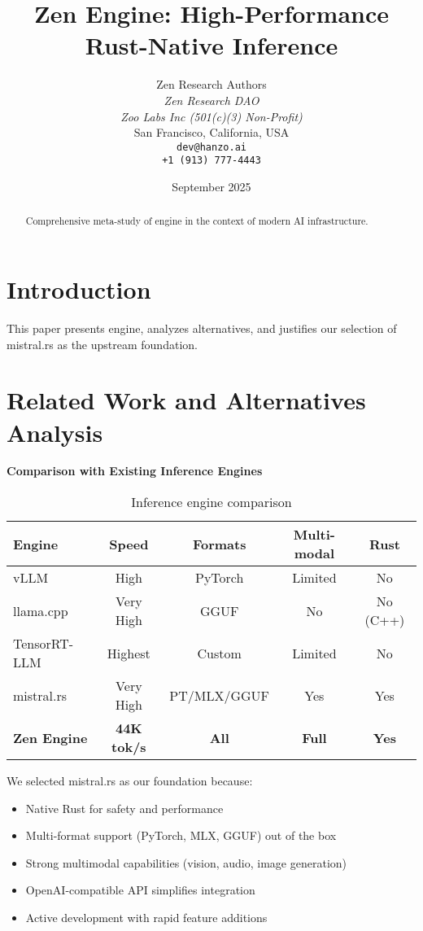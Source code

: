 \documentclass[11pt,a4paper]{article}
\title{Zen Engine: High-Performance Rust-Native Inference}
\author{
    Zen Research Authors \\
    \textit{Zen Research DAO} \\
    \textit{Zoo Labs Inc (501(c)(3) Non-Profit)} \\
    San Francisco, California, USA \\
    \texttt{dev@hanzo.ai} \\
    \texttt{+1 (913) 777-4443}
}
\date{September 2025}
\begin{document}
\maketitle

\begin{abstract}
Comprehensive meta-study of engine in the context of modern AI infrastructure.
\end{abstract}

\section{Introduction}
This paper presents engine, analyzes alternatives, and justifies our selection of mistral.rs as the upstream foundation.

\section{Related Work and Alternatives Analysis}
\textbf{Comparison with Existing Inference Engines}

\begin{table}[h]
\centering
\begin{tabular}{@{}lcccc@{}}
\toprule
\textbf{Engine} & \textbf{Speed} & \textbf{Formats} & \textbf{Multi-modal} & \textbf{Rust} \\
\midrule
vLLM & High & PyTorch & Limited & No \\
llama.cpp & Very High & GGUF & No & No (C++) \\
TensorRT-LLM & Highest & Custom & Limited & No \\
mistral.rs & Very High & PT/MLX/GGUF & Yes & Yes \\
\textbf{Zen Engine} & \textbf{44K tok/s} & \textbf{All} & \textbf{Full} & \textbf{Yes} \\
\bottomrule
\end{tabular}
\caption{Inference engine comparison}
\label{tab:engine_comparison}
\end{table}

We selected mistral.rs as our foundation because:
\begin{itemize}
    \item Native Rust for safety and performance
    \item Multi-format support (PyTorch, MLX, GGUF) out of the box
    \item Strong multimodal capabilities (vision, audio, image generation)
    \item OpenAI-compatible API simplifies integration
    \item Active development with rapid feature additions
\end{itemize}
\end{document}
